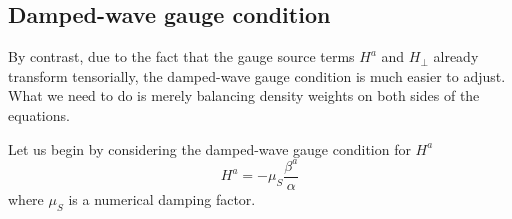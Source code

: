 \subsection{Damped-wave gauge condition}\label{dampedwave}
By contrast, due to the fact that the gauge source terms $H^{a}$ and $H_{\perp}$ already transform tensorially, the damped-wave gauge condition is much easier to adjust. What we need to do is merely balancing density weights on both sides of the equations. 

Let us begin by considering the damped-wave gauge condition for $H^{a}$
\begin{equation}\label{damped gauge vector}
H^{a} = -\mu_{S}\frac{\beta^{a}}{\alpha}
\end{equation}
where $\mu_{S}$ is a numerical damping factor. 

